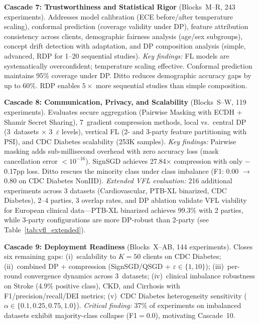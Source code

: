 \documentclass[conference]{IEEEtran}
\begin{document}
\smallskip\noindent\textbf{Cascade 7: Trustworthiness and Statistical Rigor} (Blocks~M--R, 243 experiments). Addresses model calibration (ECE before/after temperature scaling), conformal prediction (coverage validity under DP), feature attribution consistency across clients, demographic fairness analysis (age/sex subgroups), concept drift detection with adaptation, and DP composition analysis (simple, advanced, RDP for 1--20 sequential studies). \textit{Key findings:} FL models are systematically overconfident; temperature scaling effective. Conformal prediction maintains 95\% coverage under DP. Ditto reduces demographic accuracy gaps by up to 60\%. RDP enables $5\times$ more sequential studies than simple composition.

\smallskip\noindent\textbf{Cascade 8: Communication, Privacy, and Scalability} (Blocks~S--W, 119 experiments). Evaluates secure aggregation (Pairwise Masking with ECDH + Shamir Secret Sharing), 7~gradient compression methods, local vs.\ central DP (3~datasets $\times$ 3~$\varepsilon$ levels), vertical FL (2- and 3-party feature partitioning with PSI), and CDC Diabetes scalability (253K samples). \textit{Key findings:} Pairwise masking adds sub-millisecond overhead with zero accuracy loss (mask cancellation error $<10^{-16}$). SignSGD achieves 27.84$\times$ compression with only $-$0.17pp loss. Ditto rescues the minority class under class imbalance (F1: 0.00 $\to$ 0.80 on CDC Diabetes NonIID). \textit{Extended VFL evaluation:} 216 additional experiments across 3 datasets (Cardiovascular, PTB-XL binarized, CDC Diabetes), 2--4 parties, 3 overlap rates, and DP ablation validate VFL viability for European clinical data---PTB-XL binarized achieves 99.3\% with 2 parties, while 3-party configurations are more DP-robust than 2-party (see Table~\ref{tab:vfl_extended}).

\smallskip\noindent\textbf{Cascade 9: Deployment Readiness} (Blocks~X--AB, 144 experiments). Closes six remaining gaps: (i)~scalability to $K{=}50$ clients on CDC Diabetes; (ii)~combined DP + compression (SignSGD/QSGD + $\varepsilon{\in}\{1, 10\}$); (iii)~per-round convergence dynamics across 3~datasets; (iv)~clinical imbalance robustness on Stroke (4.9\% positive class), CKD, and Cirrhosis with F1/precision/recall/DEI metrics; (v)~CDC Diabetes heterogeneity sensitivity ($\alpha{\in}\{0.1, 0.25, 0.75, 1.0\}$). \textit{Critical finding:} 37\% of experiments on imbalanced datasets exhibit majority-class collapse (F1$=$0.0), motivating Cascade~10.
\end{document}
